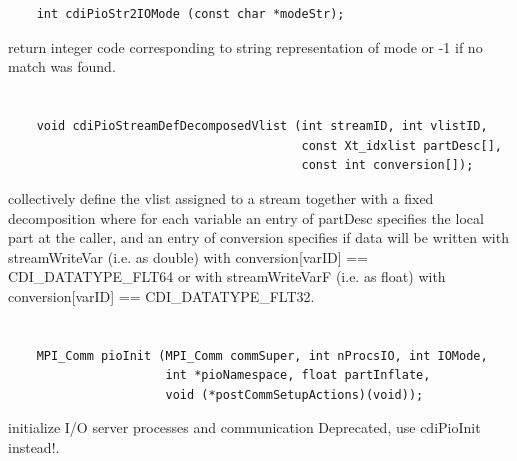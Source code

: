 \section*{\tt {}}

\begin{verbatim}
    int cdiPioStr2IOMode (const char *modeStr);
\end{verbatim}

return integer code corresponding to string
representation of mode or -1 if no match was found.


\section*{\tt {}}

\begin{verbatim}
    void cdiPioStreamDefDecomposedVlist (int streamID, int vlistID,
                                         const Xt_idxlist partDesc[],
                                         const int conversion[]);
\end{verbatim}

collectively define the vlist assigned to a
stream together with a fixed decomposition where for each variable
an entry of partDesc specifies the local part at the caller, and
an entry of conversion specifies if data will be written with
streamWriteVar (i.e. as double) with
conversion[varID] == CDI_DATATYPE_FLT64 or with streamWriteVarF
(i.e. as float) with conversion[varID] == CDI_DATATYPE_FLT32.


\section*{\tt {}}

\begin{verbatim}
    MPI_Comm pioInit (MPI_Comm commSuper, int nProcsIO, int IOMode,
                      int *pioNamespace, float partInflate,
                      void (*postCommSetupActions)(void));
\end{verbatim}

initialize I/O server processes and communication
Deprecated, use cdiPioInit instead!.


\section*{\tt {}}

